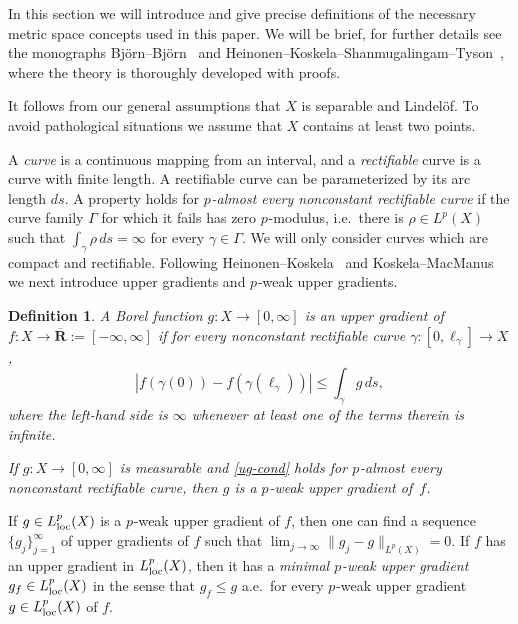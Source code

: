 \documentclass[a4paper,twoside]{article}
\theoremstyle{propositional}
\theoremstyle{descriptive}
\newtheorem{deff}[thm]{Definition}
\theoremstyle{remarkstyle}
\newcommand{\loc}{_{\rm loc}}
\newcommand{\ga}{\gamma}
\newcommand{\p}{{$p\mspace{1mu}$}}
\newcommand{\R}{\mathbf{R}}
\newcommand{\eR}{{\overline{\R}}}
\newcommand{\Ga}{\Gamma}
\newcommand{\Lploc}{L^{p}\loc}
\numberwithin{equation}{section}
\begin{document}
In this section we will introduce and give precise definitions
of the necessary metric space concepts used in this paper.
We will be brief, 
for further details
see the monographs Bj\"orn--Bj\"orn~\cite{BBbook} and
Heinonen--Koskela--Shan\-mu\-ga\-lin\-gam--Tyson~\cite{HKST},
where the theory is thoroughly  developed with proofs.

It follows from our general assumptions that $X$ is separable and Lindel\"of.
To avoid pathological situations we assume that $X$ contains
at least two points.




A \emph{curve} is a continuous mapping from an interval,
and a \emph{rectifiable} curve is a curve with finite length.
A rectifiable curve can
be parameterized by its arc length $ds$.
A property holds for \emph{\p-almost every nonconstant rectifiable curve}
if the curve family $\Ga$ for which it fails has zero \p-modulus,
i.e.\ there is $\rho\in L^p(X)$ such that
$\int_\ga \rho\,ds=\infty$ for every $\ga\in\Ga$.
We will only consider curves which are 
compact and rectifiable.
Following Heinonen--Koskela~\cite{HeKo98} and Koskela--MacManus~\cite{KoMc}
we next introduce upper gradients and \p-weak upper gradients.


\begin{deff} \label{deff-ug}
A Borel function $g:X \to [0,\infty]$ is an \emph{upper gradient}
of $f:X \to \eR:=[-\infty,\infty]$
if for every nonconstant rectifiable curve
$\gamma: [0,\ell_{\gamma}] \to X$,
\begin{equation} \label{ug-cond}
        |f(\gamma(0)) - f(\gamma(\ell_{\gamma}))| \le \int_{\gamma} g\,ds,
\end{equation}
where the left-hand side is $\infty$
whenever at least one of the
terms therein is infinite. 

If $g:X \to [0,\infty]$ is  measurable 
and \eqref{ug-cond} holds for \p-almost every 
nonconstant rectifiable curve,
then $g$ is a \emph{\p-weak upper gradient} of~$f$.
\end{deff}



If $g \in \Lploc(X)$ is a \p-weak upper gradient of $f$,
then one can find a sequence $\{g_j\}_{j=1}^\infty$
of upper gradients of $f$ such that
$\lim_{j \to \infty}\|g_j-g\|_{L^p(X)} =0$.
If $f$ has an upper gradient in $\Lploc(X)$, then
it has a \emph{minimal \p-weak upper gradient}
$g_f \in \Lploc(X)$ in the sense that $g_f \le g$ a.e.\ 
for every \p-weak upper gradient $g \in \Lploc(X)$ of $f$.
\end{document}
